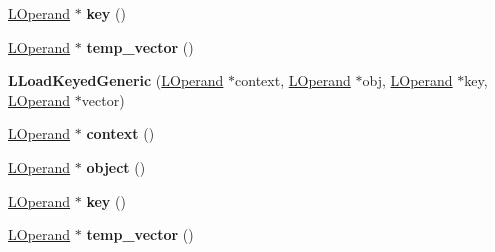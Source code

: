 \begin{DoxyCompactItemize}
\item 
\hyperlink{classv8_1_1internal_1_1_l_operand}{L\+Operand} $\ast$ {\bfseries key} ()\hypertarget{classv8_1_1internal_1_1_l_load_keyed_generic_ad55d2217ba38aa46911c0e797a610388}{}\label{classv8_1_1internal_1_1_l_load_keyed_generic_ad55d2217ba38aa46911c0e797a610388}

\item 
\hyperlink{classv8_1_1internal_1_1_l_operand}{L\+Operand} $\ast$ {\bfseries temp\+\_\+vector} ()\hypertarget{classv8_1_1internal_1_1_l_load_keyed_generic_ac529ed41ee727bf1e320ad6711ce2cff}{}\label{classv8_1_1internal_1_1_l_load_keyed_generic_ac529ed41ee727bf1e320ad6711ce2cff}

\item 
{\bfseries L\+Load\+Keyed\+Generic} (\hyperlink{classv8_1_1internal_1_1_l_operand}{L\+Operand} $\ast$context, \hyperlink{classv8_1_1internal_1_1_l_operand}{L\+Operand} $\ast$obj, \hyperlink{classv8_1_1internal_1_1_l_operand}{L\+Operand} $\ast$key, \hyperlink{classv8_1_1internal_1_1_l_operand}{L\+Operand} $\ast$vector)\hypertarget{classv8_1_1internal_1_1_l_load_keyed_generic_ae032327599cdca64b80d9e368ac5a16e}{}\label{classv8_1_1internal_1_1_l_load_keyed_generic_ae032327599cdca64b80d9e368ac5a16e}

\item 
\hyperlink{classv8_1_1internal_1_1_l_operand}{L\+Operand} $\ast$ {\bfseries context} ()\hypertarget{classv8_1_1internal_1_1_l_load_keyed_generic_a522e2bd4a7d1b71a95f891c1fc9a99c8}{}\label{classv8_1_1internal_1_1_l_load_keyed_generic_a522e2bd4a7d1b71a95f891c1fc9a99c8}

\item 
\hyperlink{classv8_1_1internal_1_1_l_operand}{L\+Operand} $\ast$ {\bfseries object} ()\hypertarget{classv8_1_1internal_1_1_l_load_keyed_generic_aadfba9d6286d59cc727bce5ae1b74ee7}{}\label{classv8_1_1internal_1_1_l_load_keyed_generic_aadfba9d6286d59cc727bce5ae1b74ee7}

\item 
\hyperlink{classv8_1_1internal_1_1_l_operand}{L\+Operand} $\ast$ {\bfseries key} ()\hypertarget{classv8_1_1internal_1_1_l_load_keyed_generic_ad55d2217ba38aa46911c0e797a610388}{}\label{classv8_1_1internal_1_1_l_load_keyed_generic_ad55d2217ba38aa46911c0e797a610388}

\item 
\hyperlink{classv8_1_1internal_1_1_l_operand}{L\+Operand} $\ast$ {\bfseries temp\+\_\+vector} ()\hypertarget{classv8_1_1internal_1_1_l_load_keyed_generic_ac529ed41ee727bf1e320ad6711ce2cff}{}\label{classv8_1_1internal_1_1_l_load_keyed_generic_ac529ed41ee727bf1e320ad6711ce2cff}


\end{DoxyCompactItemize}
